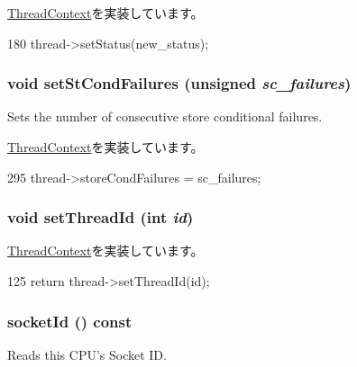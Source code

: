 \hyperlink{classThreadContext_ab09e388dd57fd5b8e05da30473b0a859}{ThreadContext}を実装しています。


\begin{DoxyCode}
180     { thread->setStatus(new_status); }
\end{DoxyCode}
\hypertarget{classInOrderThreadContext_abbe779fa43c72cd485ddb736ab17ff61}{
\subsubsection[{setStCondFailures}]{\setlength{\rightskip}{0pt plus 5cm}void setStCondFailures (unsigned {\em sc\_\-failures})}}
\label{classInOrderThreadContext_abbe779fa43c72cd485ddb736ab17ff61}
Sets the number of consecutive store conditional failures. 

\hyperlink{classThreadContext_aaa3506321089a0ec9c36d9ceff17c346}{ThreadContext}を実装しています。


\begin{DoxyCode}
295     { thread->storeCondFailures = sc_failures; }
\end{DoxyCode}
\hypertarget{classInOrderThreadContext_a9186b553811fbde99263b3fd831f1b0c}{
\subsubsection[{setThreadId}]{\setlength{\rightskip}{0pt plus 5cm}void setThreadId (int {\em id})}}
\label{classInOrderThreadContext_a9186b553811fbde99263b3fd831f1b0c}


\hyperlink{classThreadContext_a8ab94437bf0aaa86face2bc4b2dfa138}{ThreadContext}を実装しています。


\begin{DoxyCode}
125 { return thread->setThreadId(id); }
\end{DoxyCode}
\hypertarget{classInOrderThreadContext_a1ff97b43199001357718671a4d922d12}{
\subsubsection[{socketId}]{ socketId () const}}
\label{classInOrderThreadContext_a1ff97b43199001357718671a4d922d12}
Reads this CPU's Socket ID. 

